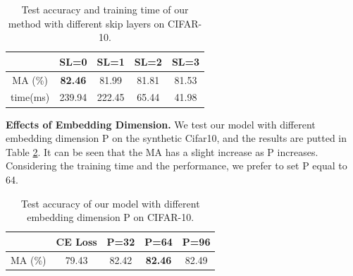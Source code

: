 \documentclass[letterpaper]{article} %
\newcommand{\bd}[1]{\textbf{#1}}
\begin{document}
\begin{table}[h]
\begin{center}
\tabcolsep=0.30cm
\begin{tabular}{c|c|c|c|c}
\hline
 &  SL=0  & SL=1 & SL=2  &  SL=3 \\
 \hline
 MA (\%)  &  \bd{82.46} & 81.99 & 81.81 & 81.53 \\
 \hline
  time(ms) & 239.94 & 222.45 & 65.44  & 41.98 \\
\hline
\end{tabular}%
\vspace{-0.30cm} 
\caption{
    Test accuracy and training time of our method with different skip layers on CIFAR-10. }
\label{tab:cifar10_skiplayer}
\vspace{-0.3cm}
\end{center}
\end{table}




\noindent\bd{Effects of Embedding Dimension.} We test our model with different embedding dimension P on the synthetic Cifar10, and the results are putted in Table \ref{tab:cifar10_P}.
It can be seen that the MA has a slight increase as P increases.
Considering the training time and the performance, we prefer to set P equal to 64.  
\begin{table}[h]
\vspace{-0.1cm}
\begin{center}
\tabcolsep=0.37cm
\begin{tabular}{c|c|c|c|c}
\hline
 & CE Loss &  P=32  &  P=64 &  P=96 \\
 \hline
 MA (\%)  & 79.43 & 82.42 & \textbf{82.46 } & 82.49\\
\hline
\end{tabular}%
\vspace{-0.3cm}
\caption{Test accuracy of our model with different embedding dimension P on CIFAR-10.} %
\label{tab:cifar10_P}
\vspace{-0.6cm}
\end{center}
\end{table}
\end{document}
